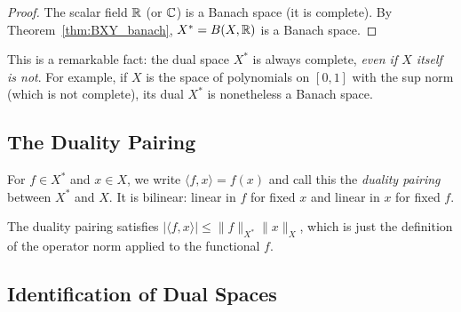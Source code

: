 \documentclass[11pt,a4paper]{article}
\begin{document}
\begin{proof}
The scalar field $\mathbb{R}$ (or $\mathbb{C}$) is a Banach space (it is complete). By
Theorem~\ref{thm:BXY_banach}, $X^* = B(X, \mathbb{R})$ is a Banach space.
\end{proof}

\begin{remark}
This is a remarkable fact: the dual space $X^*$ is always complete, \emph{even
if $X$ itself is not}. For example, if $X$ is the space of polynomials on
$[0,1]$ with the sup norm (which is not complete), its dual $X^*$ is
nonetheless a Banach space.
\end{remark}

\subsection{The Duality Pairing}

\begin{definition}
\label{def:duality_pairing}
For $f \in X^*$ and $x \in X$, we write $\langle f, x \rangle = f(x)$ and
call this the \emph{duality pairing} between $X^*$ and $X$. It is bilinear:
linear in $f$ for fixed $x$ and linear in $x$ for fixed $f$.
\end{definition}

\begin{remark}
The duality pairing satisfies
$|\langle f, x \rangle| \le \|f\|_{X^*} \|x\|_X$, which is just the
definition of the operator norm applied to the functional $f$.
\end{remark}

\subsection{Identification of Dual Spaces}
\end{document}
